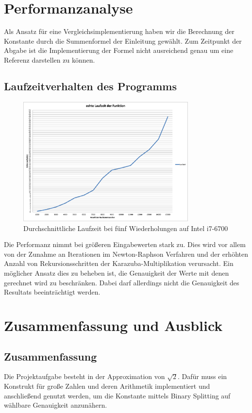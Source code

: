 \documentclass[course=erap]{aspdoc}
\begin{document}
	\section{Performanzanalyse}
	Als Ansatz für eine Vergleichsimplementierung haben wir die Berechnung der Konstante durch die Summenformel der Einleitung gewählt. Zum Zeitpunkt der Abgabe ist die Implementierung der Formel nicht ausreichend genau um eine Referenz darstellen zu können.
	
	\subsection{Laufzeitverhalten des Programms}
	\begin{figure}[h]
		\centering
		\includegraphics[width=0.8\textwidth]{Abbildungen/performanz.png}
		\caption{Durchschnittliche Laufzeit bei fünf Wiederholungen auf Intel i7-6700}
	\end{figure}
	
	Die Performanz nimmt bei größeren Eingabewerten stark zu. Dies wird vor allem von der Zunahme an Iterationen im Newton-Raphson Verfahren und der erhöhten Anzahl von Rekursionsschritten der Karazuba-Multiplikation verursacht. Ein möglicher Ansatz dies zu beheben ist, die Genauigkeit der Werte mit denen gerechnet wird zu beschränken. Dabei darf allerdings nicht die Genauigkeit des Resultats beeinträchtigt werden.
	
	\section{Zusammenfassung und Ausblick}
	\subsection{Zusammenfassung}
	Die Projektaufgabe besteht in der Approximation von $\sqrt{2}$. Dafür muss ein Konstrukt für große Zahlen und deren Arithmetik implementiert und anschließend genutzt werden, um die Konstante mittels Binary Splitting auf wählbare Genauigkeit anzunähern. 
	
\end{document}
